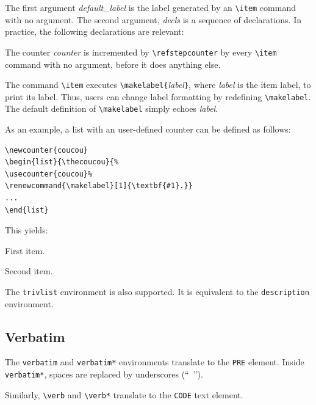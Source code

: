The first argument {\it default\_label} is the label generated by an
\verb+\item+ command with no argument.
The second argument, {\it decls} is a sequence of declarations.
In practice, the following declarations are relevant:
\begin{list}{}{}
\item[\texttt{\char92 usecounter\{}\textit{counter}\texttt{\}}]
The counter {\it counter} is incremented by \verb+\refstepcounter+
by every \verb+\item+ command with no argument, before it does
anything else.
\item[\texttt{\char92 renewcommand\{\char92
makelabel\}[1]\{}\ldots\texttt{\}}]
The command \verb+\item+ executes
\verb+\makelabel{+{\it label}\verb+}+, where {\it label} is the item
label, to print its label.
Thus, users can change label formatting by redefining
\verb+\makelabel+.
The default definition of \verb+\makelabel+ simply echoes \textit{label}.
\end{list}

As an example, a list with an user-defined counter can be defined as
follows:
\begin{verbatim}
\newcounter{coucou}
\begin{list}{\thecoucou}{%
\usecounter{coucou}%
\renewcommand{\makelabel}[1]{\textbf{#1}.}}
...
\end{list}
\end{verbatim}
This yields:
\begin{list}
  {\thecoucou}
  {\renewcommand{\makelabel}[1]{\textbf{#1}.}}
\item First item.
\item Second item.
\end{list}


The \verb+trivlist+ environment is also supported. It is equivalent to
the \verb+description+ environment.

\subsection{Verbatim}

The \verb+verbatim+ and \verb+verbatim*+ environments translate to
the \verb+PRE+ element.
Inside \verb+verbatim*+, spaces are replaced by underscores (``\verb*+ +'').


Similarly, \verb+\verb+ and \verb+\verb*+ translate to the \verb+CODE+
text element.

